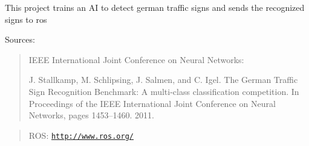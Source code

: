 This project trains an AI to detect german traffic signs and sends the recognized signs to ros

Sources\+:

\begin{quote}
I\+E\+EE International Joint Conference on Neural Networks\+:

J. Stallkamp, M. Schlipsing, J. Salmen, and C. Igel. The German Traffic Sign Recognition Benchmark\+: A multi-\/class classification competition. In Proceedings of the I\+E\+EE International Joint Conference on Neural Networks, pages 1453–1460. 2011. \end{quote}


\begin{quote}
R\+OS\+: \href{http://www.ros.org/}{\tt http\+://www.\+ros.\+org/} \end{quote}
